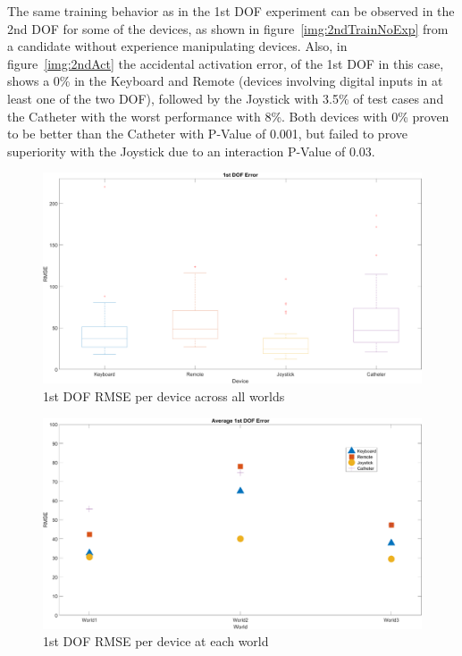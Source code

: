 The same training behavior as in the 1st DOF experiment can be observed in the 2nd DOF for some of the devices, as shown in figure~\ref{img:2ndTrainNoExp} from a candidate without experience manipulating devices. Also, in figure~\ref{img:2ndAct} the accidental activation error, of the 1st DOF in this case, shows a 0\% in the Keyboard and Remote (devices involving digital inputs in at least one of the two DOF), followed by the Joystick with 3.5\% of test cases and the Catheter with the worst performance with 8\%. Both devices with 0\% proven to be better than the Catheter with P-Value of 0.001, but failed to prove superiority with the Joystick due to an interaction P-Value of 0.03.\\

\begin{figure}[ht]
   \centering
   \includegraphics[width=1.0\textwidth]{img/1st/1stError.png}
   \caption{1st DOF RMSE per device across all worlds}
   \label{img:1stError}
\end{figure}

\begin{figure}[ht]
   \centering
   \includegraphics[width=1.0\textwidth]{img/1st/1stAvgError.png}
   \caption{1st DOF RMSE per device at each world}
   \label{img:1stAvgError}
\end{figure}

